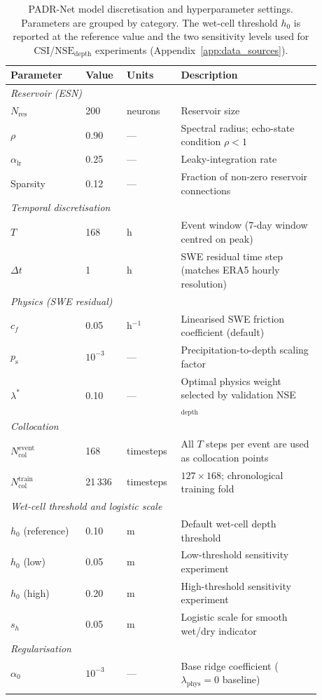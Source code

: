 \documentclass[pdflatex,sn-mathphys-ay]{sn-jnl}
\theoremstyle{thmstyleone}
\begin{document}
\begin{table}[p]
\centering
\small
\caption{PADR-Net model discretisation and hyperparameter settings.  Parameters are grouped by
  category.  The wet-cell threshold $h_0$ is reported at the reference value and the two sensitivity
  levels used for CSI/$\mathrm{NSE}_\mathrm{depth}$ experiments
  (Appendix~\ref{app:data_sources}).}
\label{tab:model_discretisation}
\begin{tabular}{p{0.22\linewidth}p{0.12\linewidth}p{0.13\linewidth}p{0.41\linewidth}}
\toprule
Parameter & Value & Units & Description \\
\midrule
\multicolumn{4}{l}{\emph{Reservoir (ESN)}} \\[2pt]
$N_{\mathrm{res}}$ & 200 & neurons & Reservoir size \\
$\rho$ & 0.90 & --- & Spectral radius; echo-state condition $\rho<1$ \\
$\alpha_{\mathrm{lr}}$ & 0.25 & --- & Leaky-integration rate \\
Sparsity & 0.12 & --- & Fraction of non-zero reservoir connections \\
\midrule
\multicolumn{4}{l}{\emph{Temporal discretisation}} \\[2pt]
$T$ & 168 & h & Event window (7-day window centred on peak) \\
$\Delta t$ & 1 & h & SWE residual time step (matches ERA5 hourly resolution) \\
\midrule
\multicolumn{4}{l}{\emph{Physics (SWE residual)}} \\[2pt]
$c_f$ & 0.05 & h$^{-1}$ & Linearised SWE friction coefficient (default) \\
$p_{\mathrm{s}}$ & $10^{-3}$ & --- & Precipitation-to-depth scaling factor \\
$\lambda^{*}$ & 0.10 & --- & Optimal physics weight selected by validation NSE$_\mathrm{depth}$ \\
\midrule
\multicolumn{4}{l}{\emph{Collocation}} \\[2pt]
$N_{\mathrm{col}}^{\mathrm{event}}$ & 168 & timesteps & All $T$ steps per event are used as collocation points \\
$N_{\mathrm{col}}^{\mathrm{train}}$ & 21\,336 & timesteps & $127\times168$; chronological training fold \\
\midrule
\multicolumn{4}{l}{\emph{Wet-cell threshold and logistic scale}} \\[2pt]
$h_0$ (reference) & 0.10 & m & Default wet-cell depth threshold \\
$h_0$ (low) & 0.05 & m & Low-threshold sensitivity experiment \\
$h_0$ (high) & 0.20 & m & High-threshold sensitivity experiment \\
$s_h$ & 0.05 & m & Logistic scale for smooth wet/dry indicator \\
\midrule
\multicolumn{4}{l}{\emph{Regularisation}} \\[2pt]
$\alpha_0$ & $10^{-3}$ & --- & Base ridge coefficient ($\lambda_{\mathrm{phys}}=0$ baseline) \\
\botrule
\end{tabular}
\end{table}
\end{document}
